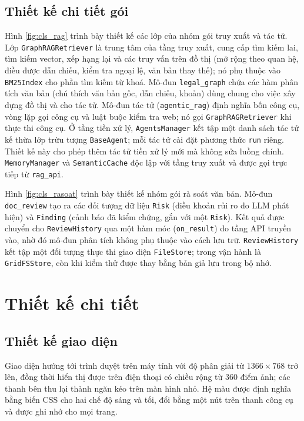 \documentclass[../DoAn.tex]{subfiles}
\begin{document}
\subsection{Thiết kế chi tiết gói}
{\sloppy Hình \ref{fig:cls_rag} trình bày thiết kế các lớp của nhóm gói truy xuất và tác tử. Lớp \texttt{GraphRAGRetriever} là trung tâm của tầng truy xuất, cung cấp tìm kiếm lai, tìm kiếm vector, xếp hạng lại và các truy vấn trên đồ thị (mở rộng theo quan hệ, điều được dẫn chiếu, kiểm tra ngoại lệ, văn bản thay thế); nó phụ thuộc vào \texttt{BM25Index} cho phần tìm kiếm từ khoá. Mô-đun \texttt{legal\_graph} chứa các hàm phân tích văn bản (chú thích văn bản gốc, dẫn chiếu, khoản) dùng chung cho việc xây dựng đồ thị và cho tác tử. Mô-đun tác tử (\texttt{agentic\_rag}) định nghĩa bốn công cụ, vòng lặp gọi công cụ và luật buộc kiểm tra web; nó gọi \texttt{GraphRAGRetriever} khi thực thi công cụ. Ở tầng tiền xử lý, \texttt{AgentsManager} kết tập một danh sách tác tử kế thừa lớp trừu tượng \texttt{BaseAgent}; mỗi tác tử cài đặt phương thức \texttt{run} riêng. Thiết kế này cho phép thêm tác tử tiền xử lý mới mà không sửa luồng chính. \texttt{MemoryManager} và \texttt{SemanticCache} độc lập với tầng truy xuất và được gọi trực tiếp từ \texttt{rag\_api}.\par}


Hình \ref{fig:cls_rasoat} trình bày thiết kế nhóm gói rà soát văn bản. Mô-đun \texttt{doc\_review} tạo ra các đối tượng dữ liệu \texttt{Risk} (điều khoản rủi ro do LLM phát hiện) và \texttt{Finding} (cảnh báo đã kiểm chứng, gắn với một \texttt{Risk}). Kết quả được chuyển cho \texttt{ReviewHistory} qua một hàm móc (\texttt{on\_result}) do tầng API truyền vào, nhờ đó mô-đun phân tích không phụ thuộc vào cách lưu trữ. \texttt{ReviewHistory} kết tập một đối tượng thực thi giao diện \texttt{FileStore}; trong vận hành là \texttt{GridFSStore}, còn khi kiểm thử được thay bằng bản giả lưu trong bộ nhớ.


\section{Thiết kế chi tiết}
\label{section:4.2}

\subsection{Thiết kế giao diện}
Giao diện hướng tới trình duyệt trên máy tính với độ phân giải từ $1366\times768$ trở lên, đồng thời hiển thị được trên điện thoại có chiều rộng từ 360 điểm ảnh; các thanh bên thu lại thành ngăn kéo trên màn hình nhỏ. Hệ màu được định nghĩa bằng biến CSS cho hai chế độ sáng và tối, đổi bằng một nút trên thanh công cụ và được ghi nhớ cho mọi trang.
\end{document}
